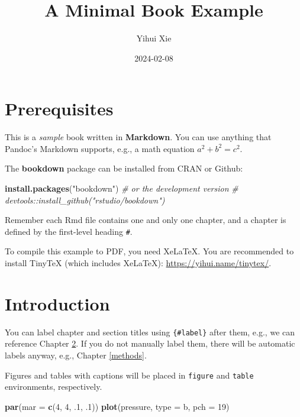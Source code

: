 \documentclass[
]{book}
\title{A Minimal Book Example}
\author{Yihui Xie}
\date{2024-02-08}
\newenvironment{Shaded}{\begin{snugshade}}{\end{snugshade}}
\newcommand{\AttributeTok}[1]{\textcolor[rgb]{0.13,0.29,0.53}{#1}}
\newcommand{\CommentTok}[1]{\textcolor[rgb]{0.56,0.35,0.01}{\textit{#1}}}
\newcommand{\DecValTok}[1]{\textcolor[rgb]{0.00,0.00,0.81}{#1}}
\newcommand{\FunctionTok}[1]{\textcolor[rgb]{0.13,0.29,0.53}{\textbf{#1}}}
\newcommand{\NormalTok}[1]{#1}
\newcommand{\StringTok}[1]{\textcolor[rgb]{0.31,0.60,0.02}{#1}}
\begin{document}
\maketitle

{
\setcounter{tocdepth}{1}
\tableofcontents
}
\hypertarget{prerequisites}{%
\chapter{Prerequisites}\label{prerequisites}}

This is a \emph{sample} book written in \textbf{Markdown}. You can use anything that Pandoc's Markdown supports, e.g., a math equation \(a^2 + b^2 = c^2\).

The \textbf{bookdown} package can be installed from CRAN or Github:

\begin{Shaded}
\begin{Highlighting}[]
\FunctionTok{install.packages}\NormalTok{(}\StringTok{"bookdown"}\NormalTok{)}
\CommentTok{\# or the development version}
\CommentTok{\# devtools::install\_github("rstudio/bookdown")}
\end{Highlighting}
\end{Shaded}

Remember each Rmd file contains one and only one chapter, and a chapter is defined by the first-level heading \texttt{\#}.

To compile this example to PDF, you need XeLaTeX. You are recommended to install TinyTeX (which includes XeLaTeX): \url{https://yihui.name/tinytex/}.

\hypertarget{intro}{%
\chapter{Introduction}\label{intro}}

You can label chapter and section titles using \texttt{\{\#label\}} after them, e.g., we can reference Chapter \ref{intro}. If you do not manually label them, there will be automatic labels anyway, e.g., Chapter \ref{methods}.

Figures and tables with captions will be placed in \texttt{figure} and \texttt{table} environments, respectively.

\begin{Shaded}
\begin{Highlighting}[]
\FunctionTok{par}\NormalTok{(}\AttributeTok{mar =} \FunctionTok{c}\NormalTok{(}\DecValTok{4}\NormalTok{, }\DecValTok{4}\NormalTok{, .}\DecValTok{1}\NormalTok{, .}\DecValTok{1}\NormalTok{))}
\FunctionTok{plot}\NormalTok{(pressure, }\AttributeTok{type =} \StringTok{\textquotesingle{}b\textquotesingle{}}\NormalTok{, }\AttributeTok{pch =} \DecValTok{19}\NormalTok{)}
\end{Highlighting}
\end{Shaded}
\end{document}
